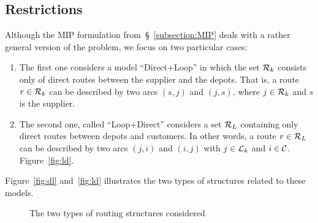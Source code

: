 \documentclass[a4paper,10pt]{article}
\begin{document}
\begin{linenumbers}
\subsection{Restrictions}
Although the MIP formulation from~\S~\ref{subsection:MIP} deals with a rather general version of the problem, we focus on two particular cases:
\begin{enumerate}
    \item The first one considers a model ``Direct+Loop'' in which the set $\mathcal{R}_k$ consists only of direct routes between the supplier and the depots. 
        That is, a route $r\in\mathcal{R}_k$ can be described by two arcs $(s,j)$ and $(j,s)$, where $j\in\mathcal{R}_k$ and $s$ is the supplier.
    \item The second one, called ``Loop+Direct'' considers a set $\mathcal{R}_L$ containing only direct routes between depots and customers. 
        In other words, a route $r\in\mathcal{R}_L$ can be described by two arcs $(j,i)$ and $(i,j)$ with $j\in\mathcal{L}_k$ and $i\in\mathcal{C}$. Figure~\ref{fig:ld}.
\end{enumerate}
Figure~\ref{fig:dl} and~\ref{fig:ld} illustrates the two types of structures related to these models.
\begin{figure}
    \centering
    \caption{The two types of routing structures considered}
\end{figure}
%

\end{linenumbers}
\end{document}
